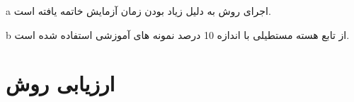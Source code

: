 \begin{sidewaystable*}
\begin{threeparttable}
\begin{tabular}{c c c c c c c c c c c c}
			\bottomrule
		\end{tabular}
		\begin{tablenotes}
			\item[a] اجرای روش به دلیل زیاد بودن زمان آزمایش خاتمه یافته است.
			\item[b] از تابع هسته مستطیلی با اندازه 10 درصد نمونه های آموزشی استفاده شده است.
		\end{tablenotes}
	\end{threeparttable}
	\label{tab:6}
\end{sidewaystable*}

\newpage

\section{ارزیابی روش }\label{sec:5:3}
